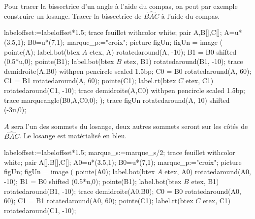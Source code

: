 \begin{changemargin}{0mm}{-25mm}
    \begin{methode}
        Pour tracer la bissectrice d'un angle à l'aide du compas, on peut par exemple construire un losange.
        \exercice
        Tracer la bissectrice de $\widehat{BAC}$ à l'aide du compas. \par\vspace*{5mm}
        \begin{Geometrie}[CoinHD={(6.5u,5u)}]
            labeloffset:=labeloffset*1.5;
            trace feuillet withcolor white;
            pair A,B[],C[];
            A=u*(3.5,1);
            B0=u*(7,1);
            marque_p:="croix";
            picture figUn;
            figUn = image (
                pointe(A);
                label.bot(btex $A$ etex, A) rotatedaround(A, -10);
                B1 = B0 shifted (0.5*u,0);
                pointe(B1);
                label.bot(btex $B$ etex, B1)  rotatedaround(B1, -10);
                trace demidroite(A,B0) withpen pencircle scaled 1.5bp;
                C0 = B0 rotatedaround(A, 60);
                C1 = B1 rotatedaround(A, 60);
                pointe(C1);
                label.rt(btex $C$ etex, C1)  rotatedaround(C1, -10);            
                trace demidroite(A,C0) withpen pencircle scaled 1.5bp;
                trace marqueangle(B0,A,C0,0);
            );
            trace figUn rotatedaround(A, 10) shifted (-3u,0);
        \end{Geometrie}
        \correction
        $A$ sera l'un des sommets du losange, deux autres sommets seront sur les côtés de $\widehat{BAC}$. Le losange est matérialisé en bleu.\par\vspace*{5mm}
        \begin{Geometrie}[CoinHD={(8.5u,5u)}]
            labeloffset:=labeloffset*1.5;
            marque_s:=marque_s/2;
            trace feuillet withcolor white;
            pair A[],B[],C[];
            A0=u*(3.5,1);
            B0=u*(7,1);
            marque_p:="croix";
            picture figUn;
            figUn = image (
                pointe(A0);
                label.bot(btex $A$ etex, A0) rotatedaround(A0, -10);
                B1 = B0 shifted (0.5*u,0);
                pointe(B1);
                label.bot(btex $B$ etex, B1)  rotatedaround(B1, -10);
                trace demidroite(A0,B0);
                C0 = B0 rotatedaround(A0, 60);
                C1 = B1 rotatedaround(A0, 60);
                pointe(C1);
                label.rt(btex $C$ etex, C1)  rotatedaround(C1, -10);            

\end{Geometrie}
\end{methode}
\end{changemargin}
